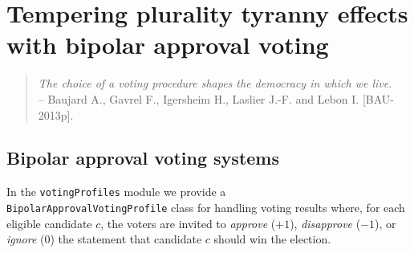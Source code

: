\chapter[Bipolar approval voting]{ Tempering plurality tyranny effects with bipolar approval voting}
\label{sec:21}

\abstract*{}

\abstract{}

\begin{quotation}\emph{The choice of a voting procedure shapes the democracy in which we live}.\\
    -- Baujard A., Gavrel F., Igersheim H., Laslier J.-F. and Lebon I. [BAU-2013p].
\end{quotation}

\section{Bipolar approval voting systems}
\label{sec:21.1}

In the \texttt{votingProfiles} module we provide a \\ \texttt{BipolarApprovalVotingProfile} class for handling voting results where, for each eligible candidate $c$, the voters are invited  to \emph{approve} ($+1$), \emph{disapprove} ($-1$), or \emph{ignore} ($0$) the statement that candidate $c$ should win the election.

